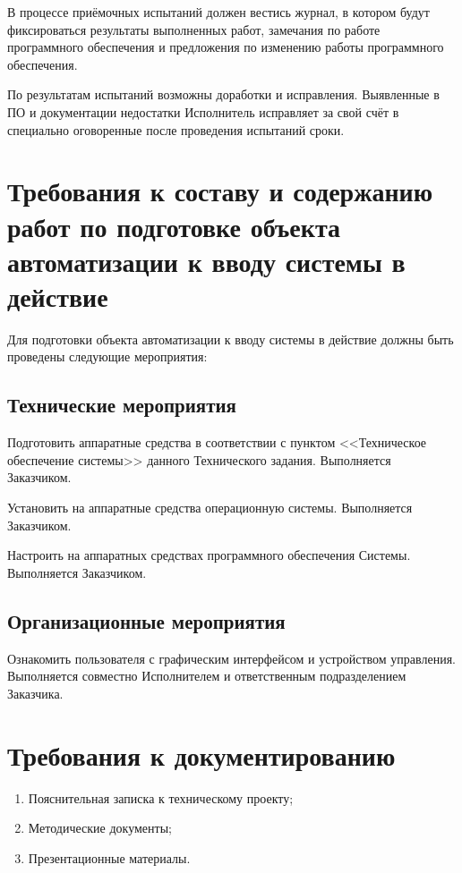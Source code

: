 В процессе приёмочных испытаний должен вестись журнал, в котором будут фиксироваться результаты 
выполненных работ, замечания по работе программного обеспечения и предложения по изменению работы 
программного обеспечения.

По результатам испытаний возможны доработки и исправления. Выявленные в ПО и документации 
недостатки Исполнитель исправляет за свой счёт в специально оговоренные после проведения 
испытаний сроки.

\chapter{Требования к составу и содержанию работ по подготовке объекта автоматизации к вводу 
    системы в действие}
Для подготовки объекта автоматизации к вводу системы в действие должны быть проведены 
следующие мероприятия:

\section{Технические мероприятия}
Подготовить аппаратные средства в соответствии с пунктом <<Техническое обеспечение системы>> 
данного Технического задания. Выполняется Заказчиком.

Установить на аппаратные средства операционную системы. Выполняется Заказчиком.

Настроить на аппаратных средствах программного обеспечения Системы. Выполняется Заказчиком.

\section{Организационные мероприятия}
Ознакомить пользователя с графическим интерфейсом и устройством управления. Выполняется совместно 
Исполнителем и ответственным подразделением Заказчика.

\chapter{Требования к документированию}
\begin{enumerate}
    \item Пояснительная записка к техническому проекту;
    \item Методические документы;
    \item Презентационные материалы.
\end{enumerate}